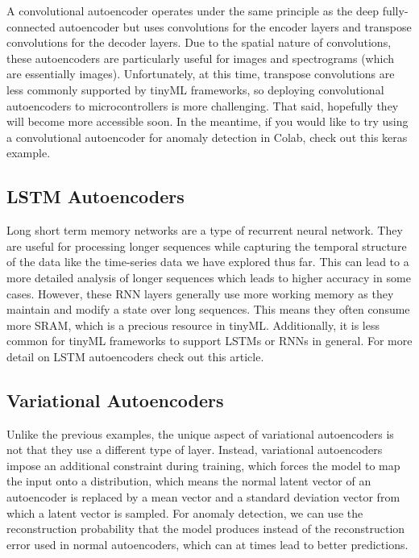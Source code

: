 A convolutional autoencoder operates under the same principle as the deep fully-connected autoencoder but uses convolutions for the encoder layers and transpose convolutions for the decoder layers. Due to the spatial nature of convolutions, these autoencoders are particularly useful for images and spectrograms (which are essentially images). Unfortunately, at this time, transpose convolutions are less commonly supported by tinyML frameworks, so deploying convolutional autoencoders to microcontrollers is more challenging. That said, hopefully they will become more accessible soon. In the meantime, if you would like to try using a convolutional autoencoder for anomaly detection in Colab, check out this keras example. 

\subsection{LSTM Autoencoders}

Long short term memory networks are a type of recurrent neural network. They are useful for processing longer sequences while capturing the temporal structure of the data like the time-series data we have explored thus far. This can lead to a more detailed analysis of longer sequences which leads to higher accuracy in some cases. However, these RNN layers generally use more working memory as they maintain and modify a state over long sequences. This means they often consume more SRAM, which is a precious resource in tinyML. Additionally, it is less common for tinyML frameworks to support LSTMs or RNNs in general. For more detail on LSTM autoencoders check out this article.

\subsection{Variational Autoencoders}

Unlike the previous examples, the unique aspect of variational autoencoders is not that they use a different type of layer. Instead, variational autoencoders impose an additional constraint during training, which forces the model to map the input onto a distribution, which means the normal latent vector of an autoencoder is replaced by a mean vector and a standard deviation vector from which a latent vector is sampled. For anomaly detection, we can use the reconstruction probability that the model produces instead of the reconstruction error used in normal autoencoders, which can at times lead to better predictions. 

